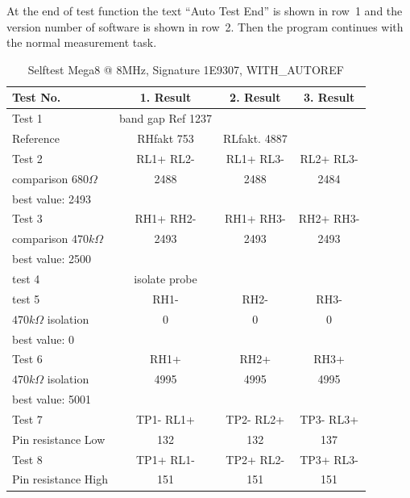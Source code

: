 At the end of test function the text ``Auto Test End''  is shown in row~1 and the version number of software is shown in row~2.
Then the program continues with the normal measurement task.

\begin{table}[H]
  \begin{center}
    \begin{tabular}{| l | c | c | c |}
    \hline
Test No. & 1. Result & 2. Result & 3. Result \\
    \hline
    \hline
Test 1 & band gap Ref  1237 &  & \\
Reference  & RHfakt 753 & RLfakt.  4887 &  \\
    \hline
Test 2 & RL1+ RL2- & RL1+ RL3- & RL2+ RL3- \\
comparison \(680\Omega\) & 2488 & 2488 & 2484 \\
best value: 2493 & & & \\
    \hline
Test 3 & RH1+ RH2- & RH1+ RH3- & RH2+ RH3- \\
comparison \(470k\Omega\) & 2493 & 2493 & 2493 \\
best value: 2500 & & & \\
    \hline
test 4 & isolate probe & & \\
    \hline
test 5 & RH1- &  RH2- & RH3- \\
\(470k\Omega\) isolation & 0 & 0 & 0 \\
best value: 0 & & & \\
    \hline
Test 6 & RH1+ & RH2+ & RH3+ \\
\(470k\Omega\) isolation & 4995 & 4995 & 4995 \\
best value: 5001 & & & \\
    \hline
Test 7 & TP1- RL1+ & TP2- RL2+ & TP3- RL3+ \\
Pin resistance Low & 132 & 132 & 137 \\
    \hline
Test 8 & TP1+ RL1- & TP2+ RL2- & TP3+ RL3- \\
Pin resistance High & 151 & 151 & 151 \\
    \hline
    \end{tabular}
  \end{center}
  \caption{Selftest Mega8 @ 8MHz, Signature 1E9307, WITH\_AUTOREF}
  \label{tab:test_m8} 
\end{table}

